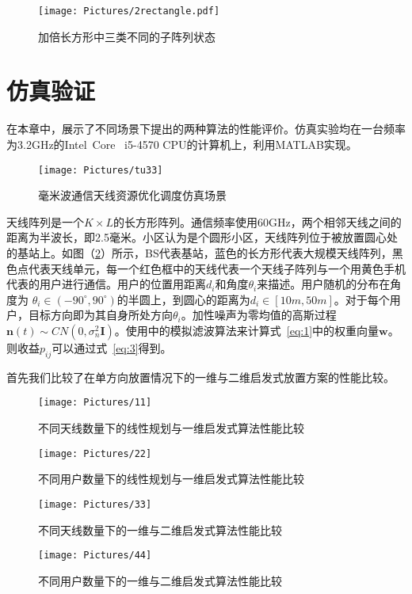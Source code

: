 \begin{figure}[htbp]
\centering
\texttt{[image: Pictures/2rectangle.pdf]}
\caption{加倍长方形中三类不同的子阵列状态}
\label{fig:2rectangle}
\end{figure}

\section{仿真验证}

在本章中，展示了不同场景下提出的两种算法的性能评价。仿真实验均在一台频率为3.2GHz的Intel\textregistered  ~Core\texttrademark ~ i5-4570 CPU的计算机上，利用MATLAB\textregistered 实现。
\begin{figure}[htbp]
\centering
\texttt{[image: Pictures/tu33]}
\caption{毫米波通信天线资源优化调度仿真场景}
\label{fig:310}
\end{figure}

天线阵列是一个$K \times L$的长方形阵列。通信频率使用60GHz，两个相邻天线之间的距离为半波长，即2.5毫米。小区认为是个圆形小区，天线阵列位于被放置圆心处的基站上。如图（\ref{fig:310}）所示，BS代表基站，蓝色的长方形代表大规模天线阵列，黑色点代表天线单元，每一个红色框中的天线代表一个天线子阵列与一个用黄色手机代表的用户进行通信。用户的位置用距离$d_i$和角度$\theta_i$来描述。用户随机的分布在角度为 $\theta_i \in (-90^{\circ}, 90^{\circ})$的半圆上，到圆心的距离为$d_i \in [10m, 50m]$。对于每个用户，目标方向即为其自身所处方向$\theta_i$。加性噪声为零均值的高斯过程$\mathbf{n}(t)\sim CN(0,\sigma_n^2 \mathbf{I})$。使用\cite{carlson1988covariance}中的模拟滤波算法来计算式~\eqref{eq:1}中的权重向量$\mathbf{w}$。则收益$p_{ij}$可以通过式~\eqref{eq:3}得到。

首先我们比较了在单方向放置情况下的一维与二维启发式放置方案的性能比较。

\begin{figure}[htbp]
    \centering
    \texttt{[image: Pictures/11]}
    \caption{不同天线数量下的线性规划与一维启发式算法性能比较}
    \label{fig:111}

\end{figure}

\begin{figure}[htbp]
    \centering
    \texttt{[image: Pictures/22]}
    \caption{不同用户数量下的线性规划与一维启发式算法性能比较}
    \label{fig:222}

\end{figure}

\begin{figure}[htbp]
    \centering
    \texttt{[image: Pictures/33]}
    \caption{不同天线数量下的一维与二维启发式算法性能比较}
    \label{fig:333}

\end{figure}
\begin{figure}[htbp]
    \centering
    \texttt{[image: Pictures/44]}
    \caption{不同用户数量下的一维与二维启发式算法性能比较}
    \label{fig:444}
\end{figure}


